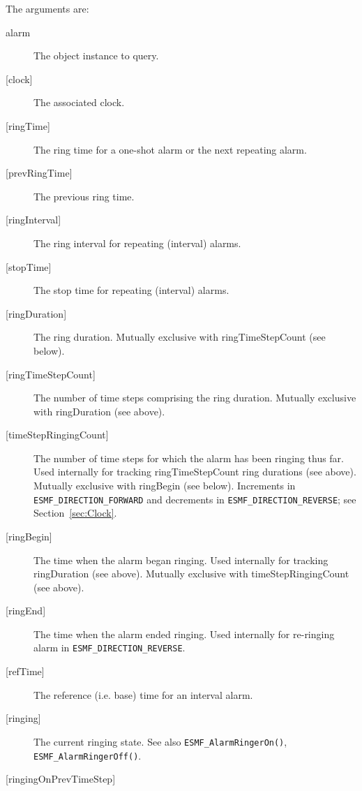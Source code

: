        The arguments are:
       \begin{description}
       \item[alarm]
            The object instance to query.
       \item[{[clock]}]
            The associated clock.
       \item[{[ringTime]}]
            The ring time for a one-shot alarm or the next repeating alarm.
       \item[{[prevRingTime]}]
            The previous ring time.
       \item[{[ringInterval]}]
            The ring interval for repeating (interval) alarms.
       \item[{[stopTime]}]
            The stop time for repeating (interval) alarms.
       \item[{[ringDuration]}]
            The ring duration.  Mutually exclusive with
            ringTimeStepCount (see below).
       \item[{[ringTimeStepCount]}]
            The number of time steps comprising the ring duration.  Mutually
            exclusive with ringDuration (see above).
       \item[{[timeStepRingingCount]}]
            The number of time steps for which the alarm has been ringing thus
            far.  Used internally for tracking ringTimeStepCount ring
            durations (see above).  Mutually exclusive with ringBegin
            (see below).  Increments in {\tt ESMF\_DIRECTION\_FORWARD} and
            decrements in {\tt ESMF\_DIRECTION\_REVERSE};
            see Section~\ref{sec:Clock}.
       \item[{[ringBegin]}]
            The time when the alarm began ringing.  Used internally for tracking
            ringDuration (see above).  Mutually exclusive with
            timeStepRingingCount (see above).
       \item[{[ringEnd]}]
            \begin{sloppypar}
            The time when the alarm ended ringing.  Used internally for
            re-ringing alarm in {\tt ESMF\_DIRECTION\_REVERSE}.
            \end{sloppypar}
       \item[{[refTime]}]
            The reference (i.e. base) time for an interval alarm.
       \item[{[ringing]}]
            The current ringing state.
            See also {\tt ESMF\_AlarmRingerOn()}, {\tt ESMF\_AlarmRingerOff()}.
       \item[{[ringingOnPrevTimeStep]}]

\end{description}
